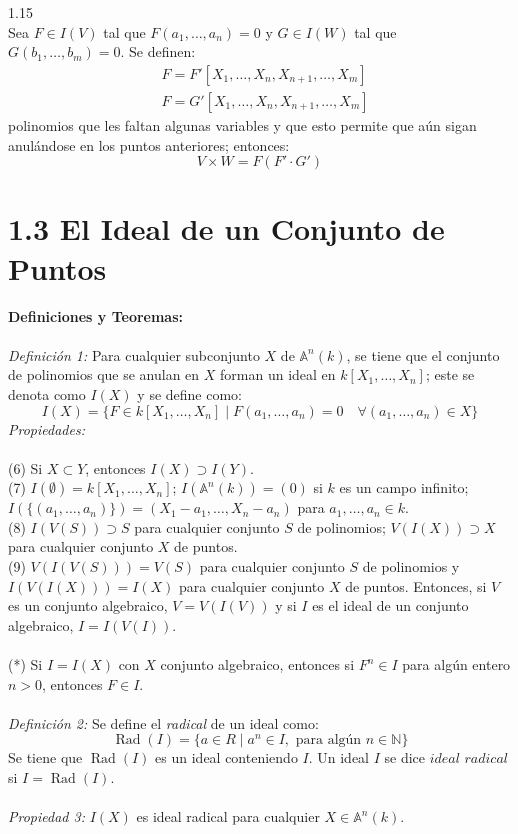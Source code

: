 \documentclass{article}
\newcommand{\A}{\mathbb{A}}
\begin{document}
\\
\\
1.15
\\
Sea $F \in I(V)$ tal que $F(a_1,\dots,a_n)=0$ y $G \in I(W)$ tal que $G(b_1,\dots,b_m)=0$. Se definen:
\begin{equation*}
\begin{aligned}
    &F=F'[X_1,\dots,X_n,X_{n+1},\dots,X_m] \\
    &F=G'[X_1,\dots,X_n,X_{n+1},\dots,X_m]
\end{aligned}
\end{equation*}
polinomios que les faltan algunas variables y que esto permite que aún sigan anulándose en los puntos anteriores; entonces:
\begin{equation*}
    V \times W = F(F' \cdot G')
\end{equation*}
\section*{1.3 El Ideal de un Conjunto de Puntos}
\textbf{Definiciones y Teoremas:}
\\
\\
\textit{Definición 1:} Para cualquier subconjunto $X$ de $\A^{n}(k)$, se tiene que el conjunto de polinomios que se anulan en $X$ forman un ideal en $k[X_1 , \dots, X_n]$; este se denota como $I(X)$ y se define como:
\begin{equation*}
    I(X)=\{F \in k[X_1, \dots, X_n] \mid F(a_1, \dots, a_n) =0 \quad \forall (a_1, \dots, a_n) \in X\}
\end{equation*}
\textit{Propiedades:}
\\
\\
(6) Si $X \subset Y$, entonces $I(X) \supset I(Y)$.
\\
(7) $I(\emptyset)=k[X_1 , \dots, X_n]$; $I(\A^{n}(k))=(0)$ si $k$ es un campo infinito; $I(\{(a_1, \dots, a_n) \})=(X_1-a_1, \dots, X_n-a_n)$ para $a_1, \dots, a_n \in k$.
\\
(8) $I(V(S)) \supset S$ para cualquier conjunto $S$ de polinomios; $V(I(X)) \supset X$ para cualquier conjunto $X$ de puntos.
\\
(9) $V(I(V(S)))=V(S)$ para cualquier conjunto $S$ de polinomios y $I(V(I(X)))=I(X)$ para cualquier conjunto $X$ de puntos. Entonces, si $V$ es un conjunto algebraico, $V=V(I(V))$ y si $I$ es el ideal de un conjunto algebraico, $I=I(V(I))$.
\\
\\
(*) Si $I=I(X)$ con $X$ conjunto algebraico, entonces si $F^n \in I$ para algún entero $n>0$, entonces $F \in I$.
\\
\\
\textit{Definición 2:} Se define el \textit{radical} de un ideal como:
\begin{equation*}
    \operatorname{Rad}{(I)}=\{a \in R \mid a^n \in I, \text{ para algún } n \in \mathbb{N} \}
\end{equation*}
Se tiene que $\operatorname{Rad}{(I)}$ es un ideal conteniendo $I$. Un ideal $I$ se dice $\textit{ideal radical}$ si $I=\operatorname{Rad}{(I)}$.
\\
\\
\textit{Propiedad 3:} $I(X)$ es ideal radical para cualquier $X \in \A^{n}(k)$.
\end{document}
